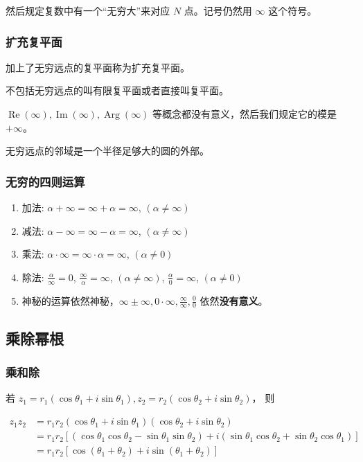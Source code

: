 然后规定复数中有一个“无穷大”来对应 \(N\) 点。记号仍然用 \(\infty\)
这个符号。
\subsubsection{扩充复平面}
\label{扩充复平面}
加上了无穷远点的复平面称为扩充复平面。

不包括无穷远点的叫有限复平面或者直接叫复平面。

\(\operatorname{Re}(\infty), \operatorname{Im}(\infty), \operatorname{Arg}(\infty)\)
等概念都没有意义，然后我们规定它的模是 \(+\infty\)。

无穷远点的邻域是一个半径足够大的圆的外部。
\subsubsection{无穷的四则运算}
\label{无穷的四则运算}
\begin{enumerate}
\item 加法: \(\alpha + \infty = \infty + \alpha = \infty\),
\((\alpha \neq \infty)\)
\item 减法: \(\alpha - \infty = \infty - \alpha = \infty\),
\((\alpha \neq \infty)\)
\item 乘法: \(\alpha \cdot \infty = \infty \cdot \alpha = \infty\),
\((\alpha \neq 0)\)
\item 除法: \(\frac{\alpha}{\infty} = 0\),
\(\frac{\infty}{\alpha} = \infty\), \((\alpha \neq \infty)\),
\(\frac{\alpha}{0} = \infty\), \((\alpha \neq 0)\)
\item 神秘的运算依然神秘，\(\infty \pm \infty, 0 \cdot \infty, \frac{\infty}{\infty}, \frac{0}{0}\)
依然\textbf{没有意义}。
\end{enumerate}
\subsection{乘除幂根}
\label{乘除幂根}
\subsubsection{乘和除}
\label{乘和除}
若 \(z_1=r_1(\cos\theta_1+i\sin\theta_1),z_2=r_2(\cos\theta_2+i\sin\theta_2)\)，
则

\begin{equation*}
\begin{aligned}
z_{1}z_{2} &= r_{1}r_{2}(\cos\theta_{1}+i\sin\theta_{1})(\cos\theta_{2}+i\sin\theta_{2}) \\
&= r_{1}r_{2}[(\cos\theta_{1}\cos\theta_{2}-\sin\theta_{1}\sin\theta_{2})+i(\sin\theta_{1}\cos\theta_{2}+\sin\theta_{2}\cos\theta_{1})] \\
&= r_{1}r_{2}[\cos(\theta_{1}+\theta_{2})+i\sin(\theta_{1}+\theta_{2})]
\end{aligned}
\end{equation*}

